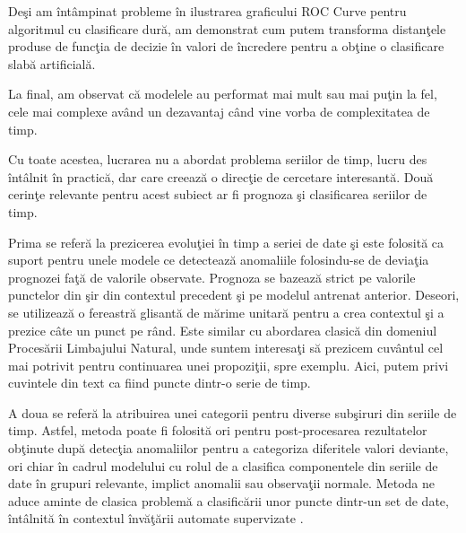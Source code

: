 Deşi am întâmpinat probleme în ilustrarea graficului ROC Curve pentru algoritmul cu clasificare
dură, am demonstrat cum putem transforma distanţele produse de funcţia de decizie în valori 
de încredere pentru a obţine o clasificare slabă artificială.

La final, am observat că modelele au performat mai mult sau mai puţin la fel, cele mai complexe 
având un dezavantaj când vine vorba de complexitatea de timp.

Cu toate acestea, lucrarea nu a abordat problema seriilor de timp, lucru des întâlnit în practică,
dar care creează o direcţie de cercetare interesantă. Două cerinţe relevante pentru acest 
subiect ar fi prognoza şi clasificarea seriilor de timp. 

Prima se referă la prezicerea evoluţiei
în timp a seriei de date şi este folosită ca suport pentru unele modele ce detectează anomaliile
folosindu-se de deviaţia prognozei faţă de valorile observate. Prognoza se bazează strict pe 
valorile punctelor din şir din contextul precedent şi pe modelul antrenat anterior. Deseori,
se utilizează o fereastră glisantă de mărime unitară pentru a crea contextul şi a prezice 
câte un punct pe rând. Este similar cu abordarea clasică 
din domeniul Procesării Limbajului Natural, unde suntem interesaţi să prezicem cuvântul cel 
mai potrivit pentru continuarea unei propoziţii, spre exemplu. Aici, putem privi cuvintele
din text ca fiind puncte dintr-o serie de timp.

A doua se referă la atribuirea unei categorii pentru diverse subşiruri din seriile de timp.
Astfel, metoda poate fi folosită ori pentru post-procesarea rezultatelor obţinute după 
detecţia anomaliilor pentru a categoriza diferitele valori deviante, ori chiar în cadrul 
modelului cu rolul de a clasifica componentele din seriile de date în grupuri relevante,
implict anomalii sau observaţii normale. Metoda ne aduce aminte de clasica problemă
a clasificării unor puncte dintr-un set de date, întâlnită în contextul învăţării automate
supervizate \cite{time-series}.